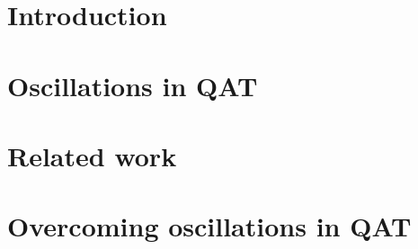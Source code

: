 \documentclass[nohyperref]{article}
\theoremstyle{plain}
\theoremstyle{definition}
\theoremstyle{remark}
\begin{document}
\begin{abstract}
When training neural networks with simulated quantization, we observe that quantized weights can, rather unexpectedly, oscillate between two grid-points. The importance of this effect and its impact on quantization-aware training (QAT) are not well-understood or investigated in literature. 
In this paper, we delve deeper into the phenomenon of weight oscillations and show that it can lead to a significant accuracy degradation due to wrongly estimated batch-normalization statistics during inference and increased noise during training. These effects are particularly pronounced in low-bit ($\leq$ 4-bits) quantization of efficient networks with depth-wise separable layers, such as MobileNets and EfficientNets. 
In our analysis we investigate several previously proposed QAT algorithms and show that most of these are unable to overcome oscillations. 
Finally, we propose two novel QAT algorithms to overcome oscillations during training: \textit{oscillation dampening} and \textit{iterative weight freezing}. We demonstrate that our algorithms achieve state-of-the-art accuracy for low-bit (3 \& 4 bits) weight and activation quantization of efficient architectures, such as , , and  on ImageNet.
Our source code is available at~\url{https://github.com/qualcomm-ai-research/oscillations-qat}.
\end{abstract}

\vspace{-0.3cm}

\section{Introduction}\label{sec:introduction}


\section{Oscillations in QAT}\label{sec:motivation}


\section{Related work}\label{sec:backgroundrelated}


\section{Overcoming oscillations in QAT}\label{sec:method}

\end{document}
